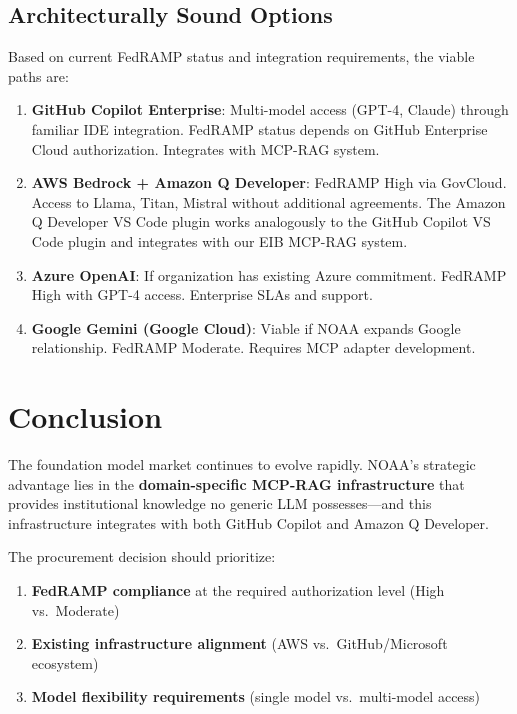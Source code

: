\documentclass[11pt]{article}
\begin{document}
\subsection*{Architecturally Sound Options}

Based on current FedRAMP status and integration requirements, the viable paths are:

\begin{enumerate}[itemsep=4pt]
    \item \textbf{GitHub Copilot Enterprise}: Multi-model access (GPT-4, Claude) through familiar IDE integration. FedRAMP status depends on GitHub Enterprise Cloud authorization. Integrates with MCP-RAG system.
    
    \item \textbf{AWS Bedrock + Amazon Q Developer}: FedRAMP High via GovCloud. Access to Llama, Titan, Mistral without additional agreements. The Amazon Q Developer VS Code plugin works analogously to the GitHub Copilot VS Code plugin and integrates with our EIB MCP-RAG system.
    
    \item \textbf{Azure OpenAI}: If organization has existing Azure commitment. FedRAMP High with GPT-4 access. Enterprise SLAs and support.
    
    \item \textbf{Google Gemini (Google Cloud)}: Viable if NOAA expands Google relationship. FedRAMP Moderate. Requires MCP adapter development.
\end{enumerate}

\section*{Conclusion}

The foundation model market continues to evolve rapidly. NOAA's strategic advantage lies in the \textbf{domain-specific MCP-RAG infrastructure} that provides institutional knowledge no generic LLM possesses---and this infrastructure integrates with both GitHub Copilot and Amazon Q Developer.

The procurement decision should prioritize:
\begin{enumerate}[itemsep=2pt]
    \item \textbf{FedRAMP compliance} at the required authorization level (High vs.\ Moderate)
    \item \textbf{Existing infrastructure alignment} (AWS vs.\ GitHub/Microsoft ecosystem)
    \item \textbf{Model flexibility requirements} (single model vs.\ multi-model access)
\end{enumerate}
\end{document}
